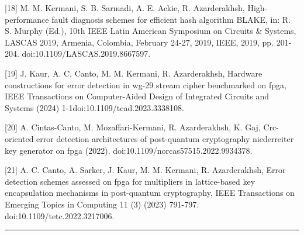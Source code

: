 [18] M. M. Kermani, S. B. Sarmadi, A. E. Ackie, R. Azarderakhsh, High-performance fault diagnosis schemes for efficient hash algorithm BLAKE, in: R. S. Murphy (Ed.), 10th IEEE Latin American Symposium on Circuits \& Systems, LASCAS 2019, Armenia, Colombia, February 24-27, 2019, IEEE, 2019, pp. 201-204. doi:10.1109/LASCAS.2019.8667597.

[19] J. Kaur, A. C. Canto, M. M. Kermani, R. Azarderakhsh, Hardware constructions for error detection in wg-29 stream cipher benchmarked on fpga, IEEE Transactions on Computer-Aided Design of Integrated Circuits and Systems (2024) 1-1doi:10.1109/tcad.2023.3338108.

[20] A. Cintas-Canto, M. Mozaffari-Kermani, R. Azarderakhsh, K. Gaj, Crc-oriented error detection architectures of post-quantum cryptography niederreiter key generator on fpga (2022). doi:10.1109/norcas57515.2022.9934378.

[21] A. C. Canto, A. Sarker, J. Kaur, M. M. Kermani, R. Azarderakhsh, Error detection schemes assessed on fpga for multipliers in lattice-based key encapsulation mechanisms in post-quantum cryptography, IEEE Transactions on Emerging Topics in Computing 11 (3) (2023) 791-797. doi:10.1109/tetc.2022.3217006.



\color{black}


\noindent\rule{\linewidth}{6.0pt}